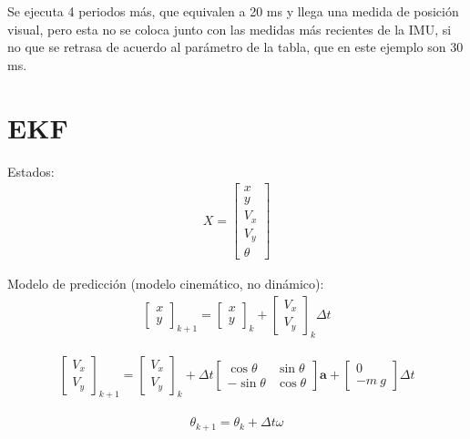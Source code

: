 Se ejecuta 4 periodos más, que equivalen a 20 ms y llega una medida de posición visual, pero esta no se coloca junto con las medidas más recientes de la IMU, si no que se retrasa de acuerdo al parámetro de la tabla, que en este ejemplo son 30 ms.  

\section{EKF}
Estados:
\begin{align}
X = 
\begin{bmatrix} 
x \\ y \\ V_x \\ V_y \\ \theta
\end{bmatrix}
\end{align}

Modelo de predicción (modelo cinemático, no dinámico):
\begin{align}
\begin{bmatrix} 
x \\ y 
\end{bmatrix}_{k+1}
=
\begin{bmatrix} 
x \\ y 
\end{bmatrix}_k
+
\begin{bmatrix} 
V_x \\ V_y 
\end{bmatrix}_k
\Delta t
\end{align}

\begin{align}
\begin{bmatrix} 
V_x \\ V_y 
\end{bmatrix}_{k+1}
=
\begin{bmatrix} 
V_x \\ V_y 
\end{bmatrix}_k + 
\Delta t
\begin{bmatrix} 
\cos{\theta} & \sin{\theta} \\ -\sin{\theta} & \cos{\theta}
\end{bmatrix}
\bm{a} +  
\begin{bmatrix} 
0 \\ - m\ g 
\end{bmatrix}\Delta t
\end{align}

\begin{align}
\theta_{k+1} = \theta_k + \Delta t \omega
\end{align}


